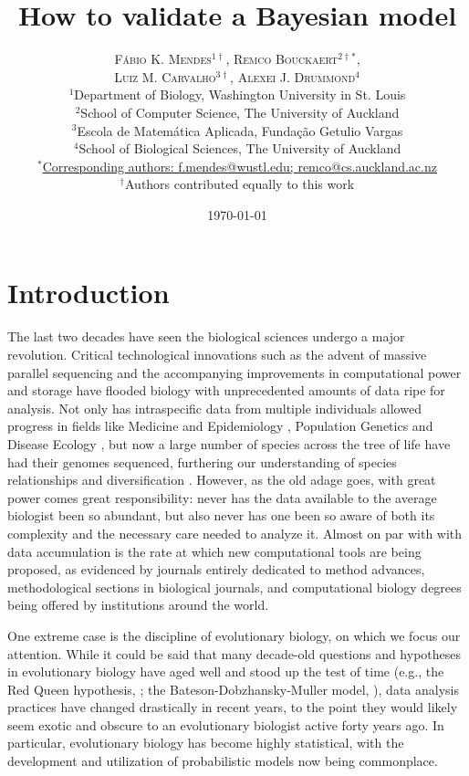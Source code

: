 \documentclass[oneside]{article}
\title{How to validate a Bayesian model} %
\author{\textsc{F\'{a}bio K. Mendes$^{1\dagger}$}, \textsc{Remco Bouckaert$^{2\dagger*}$},\\
\textsc{Luiz M. Carvalho$^{3\dagger}$}, \textsc{Alexei J. Drummond$^{4}$} \\
\small $^1$Department of Biology, Washington University in St. Louis\\
\small $^2$School of Computer Science, The University of Auckland\\
\small $^3$Escola de Matem\'{a}tica Aplicada, Fundaç\~{a}o Getulio Vargas\\
\small $^4$School of Biological Sciences, The University of Auckland\\
\small
\href{mailto:f.mendes@auckland.ac.nz}{$^*$Corresponding authors:
  f.mendes@wustl.edu; remco@cs.auckland.ac.nz}\\
{\small $^\dagger$Authors contributed equally to this work}
}
\date{\today} %
\begin{document}
\maketitle


\section*{Introduction}
The last two decades have seen the biological sciences undergo a major revolution.
Critical technological innovations such as the advent of massive parallel sequencing and the accompanying improvements in computational power and storage have flooded biology with unprecedented amounts of data ripe for analysis.
Not only has intraspecific data from multiple individuals allowed progress in fields like Medicine and Epidemiology
\citep[e.g.,][]{1000g,humanmicrobiome,neafsey15}, Population Genetics \citep[e.g.,][]{lynch07,lack16,demanuel16} and Disease Ecology \citep[e.g.,][]{rosenblum13,bates18}, but now a large number of species across the tree of life have had their genomes sequenced, furthering our understanding of species relationships and diversification \citep[e.g.,][]{martin13,brawand14,jarvis14,novikova16,pease2016,kawahara19,upham19}.
However, as the old adage goes, with great power comes great responsibility: never has the data available to the average biologist been so abundant, but also never has one been so aware of both its complexity and the necessary care needed to analyze it. 
Almost on par with with data accumulation is the rate at which new computational tools are being proposed, as evidenced by journals entirely dedicated to method advances, methodological sections in biological journals, and computational biology degrees being offered by institutions around the world.

One extreme case is the discipline of evolutionary biology, on which we focus our attention.
While it could be said that many decade-old questions and hypotheses in evolutionary biology have aged well and stood up the test of time (e.g., the Red Queen hypothesis, \citealt{vanvalen73,lively87,morran11,gibson15}; the Bateson-Dobzhansky-Muller model, \citealt{dob36,muller40,hopkins12,roda17}), data analysis practices have changed drastically in recent years, to the point they would likely seem exotic and obscure to an evolutionary biologist active forty years ago. 
In particular, evolutionary biology has become highly statistical, with the development and utilization of probabilistic models now being commonplace.
\end{document}
